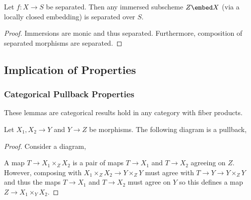 \documentclass[12pt]{article}
\begin{document}
\begin{prop}
Let $f : X \to S$ be separated. Then any immersed subscheme $Z \embed X$ (via a locally closed embedding) is separated over $S$.
\end{prop}

\begin{proof}
Immersions are monic and thus separated. Furthermore, composition of separated morphisms are separated. 
\end{proof}

\subsection{Implication of Properties}

\subsubsection{Categorical Pullback Properties}

\begin{rmk}
These lemmas are categorical results hold in any category with fiber products.
\end{rmk}

\begin{lemma}
Let $X_1, X_2 \to Y$ and $Y \to Z$ be morphisms. The following diagram is a pullback,
\begin{center}
\end{center}
\end{lemma}

\begin{proof}
Consider a diagram,
\begin{center}
\end{center}
A map $T \to X_1 \times_Z X_2$ is a pair of maps $T \to X_1$ and $T \to X_2$ agreeing on $Z$. However, composing with $X_1 \times_Z X_2 \to Y \times_Z Y$ must agree with $T \to Y \to Y \times_Z Y$ and thus the maps $T \to X_1$ and $T \to X_2$ must agree on $Y$ so this defines a map $Z \to X_1 \times_Y X_2$. 
\end{proof}
\end{document}
